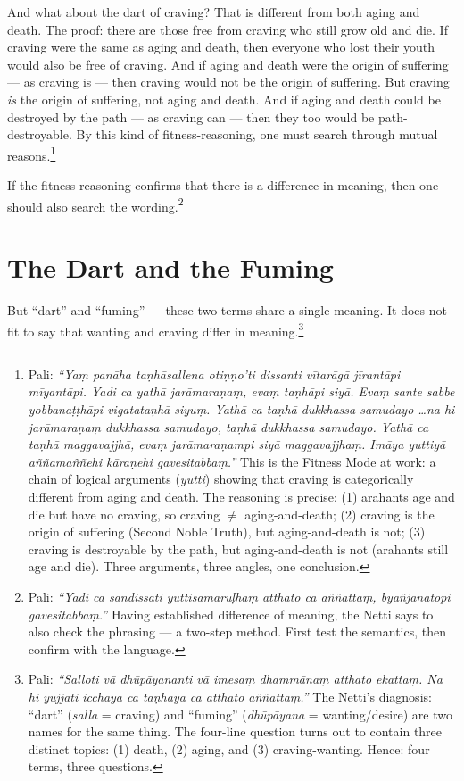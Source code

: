 And what about the dart of craving? That is different from both aging and death. The proof: there are those free from craving who still grow old and die. If craving were the same as aging and death, then everyone who lost their youth would also be free of craving. And if aging and death were the origin of suffering --- as craving is --- then craving would not be the origin of suffering. But craving \textit{is} the origin of suffering, not aging and death. And if aging and death could be destroyed by the path --- as craving can --- then they too would be path-destroyable. By this kind of fitness-reasoning, one must search through mutual reasons.\footnote{Pali: \textit{``Yaṃ panāha taṇhāsallena otiṇṇo'ti dissanti vītarāgā jīrantāpi mīyantāpi. Yadi ca yathā jarāmaraṇaṃ, evaṃ taṇhāpi siyā. Evaṃ sante sabbe yobbanaṭṭhāpi vigatataṇhā siyuṃ. Yathā ca taṇhā dukkhassa samudayo \ldots na hi jarāmaraṇaṃ dukkhassa samudayo, taṇhā dukkhassa samudayo. Yathā ca taṇhā maggavajjhā, evaṃ jarāmaraṇampi siyā maggavajjhaṃ. Imāya yuttiyā aññamaññehi kāraṇehi gavesitabbaṃ.''} This is the Fitness Mode at work: a chain of logical arguments (\textit{yutti}) showing that craving is categorically different from aging and death. The reasoning is precise: (1) arahants age and die but have no craving, so craving $\neq$ aging-and-death; (2) craving is the origin of suffering (Second Noble Truth), but aging-and-death is not; (3) craving is destroyable by the path, but aging-and-death is not (arahants still age and die). Three arguments, three angles, one conclusion.}

If the fitness-reasoning confirms that there is a difference in meaning, then one should also search the wording.\footnote{Pali: \textit{``Yadi ca sandissati yuttisamārūḷhaṃ atthato ca aññattaṃ, byañjanatopi gavesitabbaṃ.''} Having established difference of meaning, the Netti says to also check the phrasing --- a two-step method. First test the semantics, then confirm with the language.}

\section*{The Dart and the Fuming}

But ``dart'' and ``fuming'' --- these two terms share a single meaning. It does not fit to say that wanting and craving differ in meaning.\footnote{Pali: \textit{``Salloti vā dhūpāyananti vā imesaṃ dhammānaṃ atthato ekattaṃ. Na hi yujjati icchāya ca taṇhāya ca atthato aññattaṃ.''} The Netti's diagnosis: ``dart'' (\textit{salla} = craving) and ``fuming'' (\textit{dhūpāyana} = wanting/desire) are two names for the same thing. The four-line question turns out to contain three distinct topics: (1) death, (2) aging, and (3) craving-wanting. Hence: four terms, three questions.}

